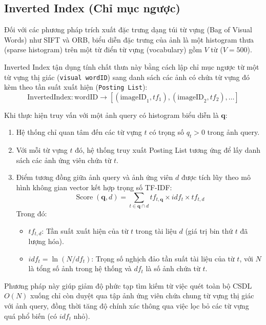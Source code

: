 \subsection{Inverted Index (Chỉ mục ngược)}
Đối với các phương pháp trích xuất đặc trưng dạng túi từ vựng (Bag of Visual Words) như SIFT và ORB, biểu diễn đặc trưng của ảnh là một histogram thưa (sparse histogram) trên một từ điển từ vựng (vocabulary) gồm $V$ từ ($V=500$). 

Inverted Index tận dụng tính chất thưa này bằng cách lập chỉ mục ngược từ một từ vựng thị giác (\texttt{visual wordID}) sang danh sách các ảnh có chứa từ vựng đó kèm theo tần suất xuất hiện (\texttt{Posting List}):
\begin{equation}
\text{InvertedIndex}: \text{wordID} \to [ (\text{imageID}_1, tf_1), (\text{imageID}_2, tf_2), \dots ]
\end{equation}

Khi thực hiện truy vấn với một ảnh query có histogram biểu diễn là $\mathbf{q}$:
\begin{enumerate}
    \item Hệ thống chỉ quan tâm đến các từ vựng $t$ có trọng số $q_t > 0$ trong ảnh query.
    \item Với mỗi từ vựng $t$ đó, hệ thống truy xuất Posting List tương ứng để lấy danh sách các ảnh ứng viên chứa từ $t$.
    \item Điểm tương đồng giữa ảnh query và ảnh ứng viên $d$ được tích lũy theo mô hình không gian vector kết hợp trọng số TF-IDF:
    \begin{equation}
    \operatorname{Score}(\mathbf{q}, d) = \sum_{t \in \mathbf{q} \cap d} tf_{t,\mathbf{q}} \times idf_t \times tf_{t,d}
    \end{equation}
    Trong đó:
    \begin{itemize}
        \item $tf_{t,d}$: Tần suất xuất hiện của từ $t$ trong tài liệu $d$ (giá trị bin thứ $t$ đã lượng hóa).
        \item $idf_t = \ln(N / df_t)$: Trọng số nghịch đảo tần suất tài liệu của từ $t$, với $N$ là tổng số ảnh trong hệ thống và $df_t$ là số ảnh chứa từ $t$.
    \end{itemize}
\end{enumerate}
Phương pháp này giúp giảm độ phức tạp tìm kiếm từ việc quét toàn bộ CSDL $O(N)$ xuống chỉ còn duyệt qua tập ảnh ứng viên chứa chung từ vựng thị giác với ảnh query, đồng thời tăng độ chính xác thông qua việc lọc bỏ các từ vựng quá phổ biến (có $idf_t$ nhỏ).

